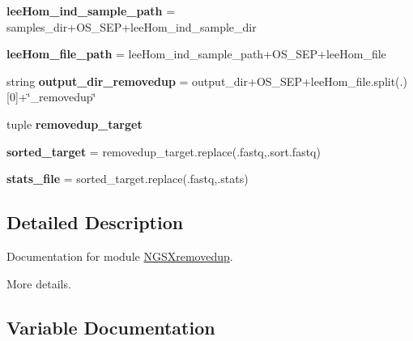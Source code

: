 \begin{DoxyCompactItemize}
\item 
{\bfseries lee\+Hom\+\_\+ind\+\_\+sample\+\_\+path} = samples\+\_\+dir+O\+S\+\_\+\+S\+EP+lee\+Hom\+\_\+ind\+\_\+sample\+\_\+dir\hypertarget{namespaceNGSXremovedup_a4e67167b89511ef855eb48b45add9734}{}\label{namespaceNGSXremovedup_a4e67167b89511ef855eb48b45add9734}

\item 
{\bfseries lee\+Hom\+\_\+file\+\_\+path} = lee\+Hom\+\_\+ind\+\_\+sample\+\_\+path+O\+S\+\_\+\+S\+EP+lee\+Hom\+\_\+file\hypertarget{namespaceNGSXremovedup_a502a29412d31367f089749149e28b540}{}\label{namespaceNGSXremovedup_a502a29412d31367f089749149e28b540}

\item 
string {\bfseries output\+\_\+dir\+\_\+removedup} = output\+\_\+dir+O\+S\+\_\+\+S\+EP+lee\+Hom\+\_\+file.\+split(\textquotesingle{}.\textquotesingle{})\mbox{[}0\mbox{]}+\char`\"{}\+\_\+removedup\char`\"{}\hypertarget{namespaceNGSXremovedup_a6b3728f12a8b695fd34d9f7dfd452d1b}{}\label{namespaceNGSXremovedup_a6b3728f12a8b695fd34d9f7dfd452d1b}

\item 
tuple {\bfseries removedup\+\_\+target}
\item 
{\bfseries sorted\+\_\+target} = removedup\+\_\+target.\+replace(\textquotesingle{}.fastq\textquotesingle{},\textquotesingle{}.sort.\+fastq\textquotesingle{})\hypertarget{namespaceNGSXremovedup_a4266bffdb1b81f4b464b85a7559971f4}{}\label{namespaceNGSXremovedup_a4266bffdb1b81f4b464b85a7559971f4}

\item 
{\bfseries stats\+\_\+file} = sorted\+\_\+target.\+replace(\textquotesingle{}.fastq\textquotesingle{},\textquotesingle{}.stats\textquotesingle{})\hypertarget{namespaceNGSXremovedup_a17688cc8ea68adb5b410ed830c5337f8}{}\label{namespaceNGSXremovedup_a17688cc8ea68adb5b410ed830c5337f8}

\end{DoxyCompactItemize}


\subsection{Detailed Description}
Documentation for module \hyperlink{namespaceNGSXremovedup}{N\+G\+S\+Xremovedup}. 

More details. 

\subsection{Variable Documentation}
